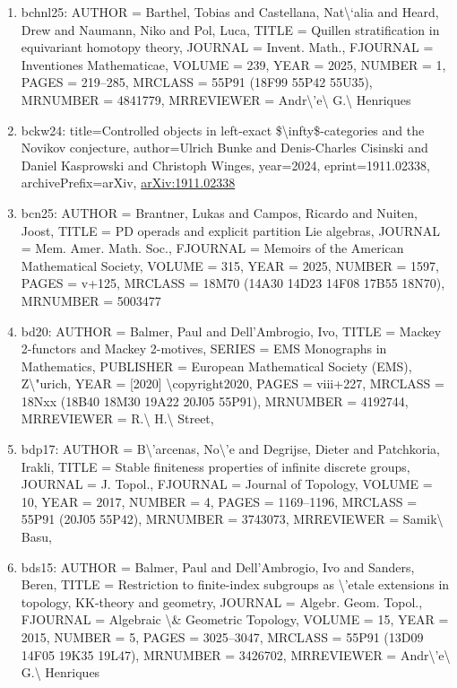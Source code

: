 \documentclass[11pt]{article}
\begin{document}
\begin{enumerate}[leftmargin=*]
  \item bchnl25: AUTHOR = Barthel, Tobias and Castellana, Nat\textbackslash{}`alia and Heard, Drew and Naumann, Niko and Pol, Luca, TITLE = Quillen stratification in equivariant homotopy theory, JOURNAL = Invent. Math., FJOURNAL = Inventiones Mathematicae, VOLUME = 239, YEAR = 2025, NUMBER = 1, PAGES = 219--285, MRCLASS = 55P91 (18F99 55P42 55U35), MRNUMBER = 4841779, MRREVIEWER = Andr\textbackslash{}'e\textbackslash{} G.\textbackslash{} Henriques
  \item bckw24: title=Controlled objects in left-exact \$\textbackslash{}infty\$-categories and the Novikov conjecture, author=Ulrich Bunke and Denis-Charles Cisinski and Daniel Kasprowski and Christoph Winges, year=2024, eprint=1911.02338, archivePrefix=arXiv, \href{https://arxiv.org/abs/1911.02338}{arXiv:1911.02338}
  \item bcn25: AUTHOR = Brantner, Lukas and Campos, Ricardo and Nuiten, Joost, TITLE = PD operads and explicit partition Lie algebras, JOURNAL = Mem. Amer. Math. Soc., FJOURNAL = Memoirs of the American Mathematical Society, VOLUME = 315, YEAR = 2025, NUMBER = 1597, PAGES = v+125, MRCLASS = 18M70 (14A30 14D23 14F08 17B55 18N70), MRNUMBER = 5003477
  \item bd20: AUTHOR = Balmer, Paul and Dell'Ambrogio, Ivo, TITLE = Mackey 2-functors and Mackey 2-motives, SERIES = EMS Monographs in Mathematics, PUBLISHER = European Mathematical Society (EMS), Z\textbackslash{}"urich, YEAR = [2020] \textbackslash{}copyright2020, PAGES = viii+227, MRCLASS = 18Nxx (18B40 18M30 19A22 20J05 55P91), MRNUMBER = 4192744, MRREVIEWER = R.\textbackslash{} H.\textbackslash{} Street,
  \item bdp17: AUTHOR = B\textbackslash{}'arcenas, No\textbackslash{}'e and Degrijse, Dieter and Patchkoria, Irakli, TITLE = Stable finiteness properties of infinite discrete groups, JOURNAL = J. Topol., FJOURNAL = Journal of Topology, VOLUME = 10, YEAR = 2017, NUMBER = 4, PAGES = 1169--1196, MRCLASS = 55P91 (20J05 55P42), MRNUMBER = 3743073, MRREVIEWER = Samik\textbackslash{} Basu,
  \item bds15: AUTHOR = Balmer, Paul and Dell'Ambrogio, Ivo and Sanders, Beren, TITLE = Restriction to finite-index subgroups as \textbackslash{}'etale extensions in topology, KK-theory and geometry, JOURNAL = Algebr. Geom. Topol., FJOURNAL = Algebraic \textbackslash{}\& Geometric Topology, VOLUME = 15, YEAR = 2015, NUMBER = 5, PAGES = 3025--3047, MRCLASS = 55P91 (13D09 14F05 19K35 19L47), MRNUMBER = 3426702, MRREVIEWER = Andr\textbackslash{}'e\textbackslash{} G.\textbackslash{} Henriques

\end{enumerate}
\end{document}
